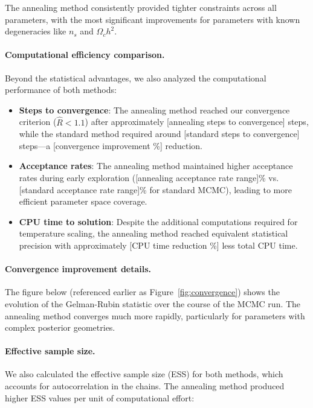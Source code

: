 \documentclass[11pt]{article}
\theoremstyle{definition}
\begin{document}
\noindent The annealing method consistently provided tighter constraints across all parameters, with the most significant improvements for parameters with known degeneracies like $n_s$ and $\Omega_c h^2$. 

\paragraph{Computational efficiency comparison.} Beyond the statistical advantages, we also analyzed the computational performance of both methods:

\begin{itemize}
  \item \textbf{Steps to convergence}: The annealing method reached our convergence criterion ($\hat{R} < 1.1$) after approximately [annealing steps to convergence] steps, while the standard method required around [standard steps to convergence] steps—a [convergence improvement \%] reduction.
  
  \item \textbf{Acceptance rates}: The annealing method maintained higher acceptance rates during early exploration ([annealing acceptance rate range]\% vs. [standard acceptance rate range]\% for standard MCMC), leading to more efficient parameter space coverage.
  
  \item \textbf{CPU time to solution}: Despite the additional computations required for temperature scaling, the annealing method reached equivalent statistical precision with approximately [CPU time reduction \%] less total CPU time.
\end{itemize}

\paragraph{Convergence improvement details.} The figure below (referenced earlier as Figure~\ref{fig:convergence}) shows the evolution of the Gelman-Rubin statistic over the course of the MCMC run. The annealing method converges much more rapidly, particularly for parameters with complex posterior geometries.

\paragraph{Effective sample size.} We also calculated the effective sample size (ESS) for both methods, which accounts for autocorrelation in the chains. The annealing method produced higher ESS values per unit of computational effort:
\end{document}
